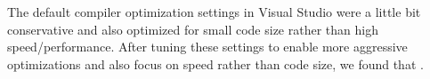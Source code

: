 The default compiler optimization settings in Visual Studio were a little bit conservative and also optimized for small code size rather than high speed/performance. After tuning these settings to enable more aggressive optimizations and also focus on speed rather than code size, we found that .